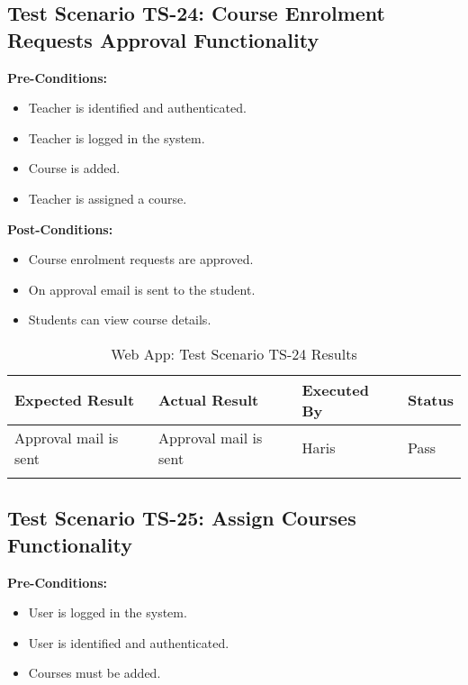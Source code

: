 \subsection{Test Scenario TS-24: Course Enrolment Requests Approval Functionality}

\textbf{Pre-Conditions: }
\begin{itemize}

\item Teacher is identified and authenticated.
\item Teacher is logged in the system.
\item Course is added.
\item Teacher is assigned a course.

\end{itemize}

\textbf{Post-Conditions: }
\begin{itemize}
\item Course enrolment requests are approved.
\item On approval email is sent to the student.
\item Students can view course details.


\end{itemize}


\bigskip

\begin{longtable}{|p{4cm}|p{4cm}|p{2cm}|p{2cm}|}
\hline
\textbf{Expected Result} & \textbf{Actual Result} & \textbf{Executed By} & \textbf{Status}\\
\hline
Approval mail is sent &
Approval mail is sent &
Haris &
Pass \\
\hline

\caption{Web App: Test Scenario TS-24 Results}
\end{longtable}


\subsection{Test Scenario TS-25: Assign Courses Functionality}

\textbf{Pre-Conditions: }
\begin{itemize}

\item User is logged in the system.
\item User is identified and authenticated.
\item Courses must be added.

\end{itemize}

